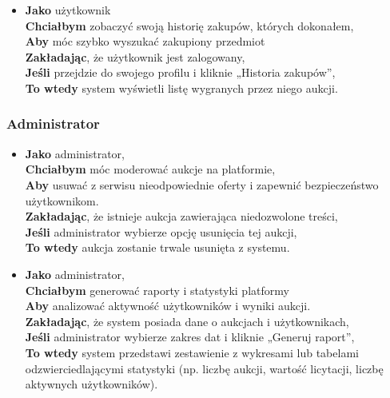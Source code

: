 \begin{itemize}
    \item \textbf{Jako} użytkownik\\
          \textbf{Chciałbym} zobaczyć swoją historię zakupów, których dokonałem,\\
          \textbf{Aby} móc szybko wyszukać zakupiony przedmiot \\
          \textbf{Zakładając}, że użytkownik jest zalogowany,\\
          \textbf{Jeśli} przejdzie do swojego profilu i kliknie „Historia zakupów”,\\
          \textbf{To wtedy} system wyświetli listę wygranych przez niego aukcji.\\
\end{itemize}
\subsubsection{Administrator}
\begin{itemize}
    \item \textbf{Jako} administrator,\\
          \textbf{Chciałbym} móc moderować aukcje na platformie, \\
          \textbf{Aby} usuwać z serwisu nieodpowiednie oferty i zapewnić bezpieczeństwo użytkownikom. \\
          \textbf{Zakładając}, że istnieje aukcja zawierająca niedozwolone treści,\\
          \textbf{Jeśli} administrator wybierze opcję usunięcia tej aukcji, \\
          \textbf{To wtedy} aukcja zostanie trwale usunięta z systemu.\\
    \item \textbf{Jako} administrator, \\
          \textbf{Chciałbym} generować raporty i statystyki platformy \\
          \textbf{Aby} analizować aktywność użytkowników i wyniki aukcji. \\
          \textbf{Zakładając}, że system posiada dane o aukcjach i użytkownikach,\\
          \textbf{Jeśli} administrator wybierze zakres dat i kliknie „Generuj raport”,\\
          \textbf{To wtedy} system przedstawi zestawienie z wykresami lub tabelami odzwierciedlającymi statystyki (np. liczbę aukcji, wartość licytacji, liczbę aktywnych użytkowników).


\end{itemize}
